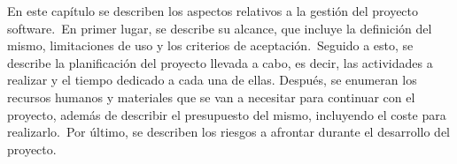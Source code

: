 
En este capítulo se describen los aspectos relativos a la gestión del proyecto software.\ En primer lugar, se
describe su alcance, que incluye la definición del mismo, limitaciones de uso y los criterios de
aceptación.\ Seguido a esto, se describe la planificación
del proyecto llevada a cabo, es decir, las actividades a realizar y el tiempo dedicado a cada una de ellas.
Después, se enumeran los recursos humanos y materiales que se van a necesitar
para continuar con el proyecto, además de describir el presupuesto del mismo, incluyendo el coste
para realizarlo.\ Por último, se describen los riesgos a afrontar durante el desarrollo del proyecto.






